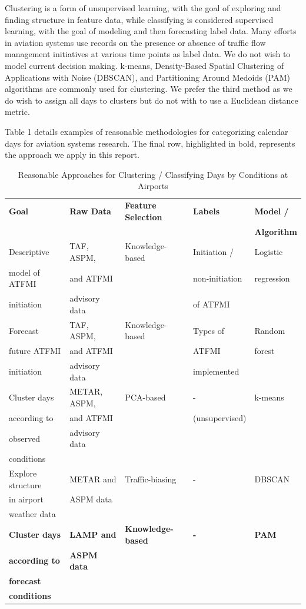 \documentclass[11pt]{scrartcl}
\begin{document}
Clustering is a form of unsupervised learning, with the goal of exploring and finding structure in feature data, while classifying is considered supervised learning, with the goal of modeling and then forecasting label data.  Many efforts in aviation systems use records on the presence or absence of traffic flow management initiatives at various time points as label data.  We do not wish to model current decision making.  k-means, Density-Based Spatial Clustering of Applications with Noise (DBSCAN), and Partitioning Around Medoids (PAM) algorithms are commonly used for clustering.  We prefer the third method as we do wish to assign all days to clusters but do not with to use a Euclidean distance metric.

Table 1 details examples of reasonable methodologies for categorizing calendar days for aviation systems research.  The final row, highlighted in bold, represents the approach we apply in this report.

\begin{table}[htdp]
\caption{Reasonable Approaches for Clustering / Classifying Days by Conditions at Airports}
\begin{center}
\begin{tabular}{|l|l|l|l|l|}
\hline
{\bf Goal}&{\bf Raw Data}&{\bf Feature Selection}&{\bf Labels}&{\bf Model /}\\
&&&&{\bf Algorithm}\\
\hline
Descriptive &TAF, ASPM,& Knowledge-based &Initiation / & Logistic\\
model of ATFMI &and ATFMI&& non-initiation &regression\\
initiation &advisory data&& of ATFMI &\\
\hline
Forecast &TAF, ASPM,& Knowledge-based & Types of & Random\\
future ATFMI &and ATFMI&& ATFMI &forest\\
initiation &advisory data&& implemented &\\
\hline
Cluster days &METAR, ASPM,& PCA-based & - & k-means\\
according to &and ATFMI& & (unsupervised) & \\
observed &advisory data & & & \\
conditions & & & &\\
\hline
Explore structure& METAR and & Traffic-biasing & - & DBSCAN\\
in airport & ASPM data & & & \\
weather data & & & & \\
\hline
{\bf Cluster days} & {\bf LAMP and} & {\bf Knowledge-based} & {\bf -} & {\bf PAM}\\
{\bf according to} & {\bf ASPM data} & & & \\
{\bf forecast} & & & &\\
{\bf conditions} & & & &\\
\hline
\end{tabular}
\end{center}
\label{default}
\end{table}
\end{document}
